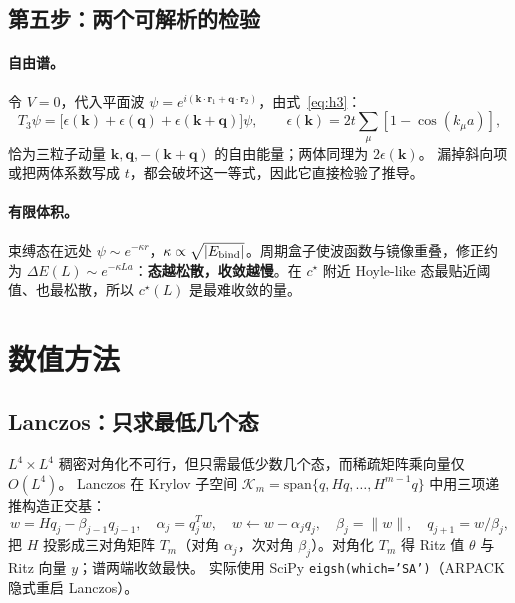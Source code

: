\documentclass[UTF8,fontset=fandol,11pt,a4paper]{ctexart}
\newcommand{\rr}{\mathbf r}
\begin{document}
\subsection{第五步：两个可解析的检验}\label{sec:analytic}
\paragraph{自由谱。}令 $V=0$，代入平面波 $\psi=e^{i(\mathbf k\cdot\rr_1+\mathbf q\cdot\rr_2)}$，由式~\eqref{eq:h3}：
\begin{equation}
T_3\psi=\big[\epsilon(\mathbf k)+\epsilon(\mathbf q)+\epsilon(\mathbf k+\mathbf q)\big]\psi,\qquad
\epsilon(\mathbf k)=2t\sum_{\mu}[1-\cos(k_\mu a)],
\end{equation}
恰为三粒子动量 $\mathbf k,\mathbf q,-(\mathbf k+\mathbf q)$ 的自由能量；两体同理为 $2\epsilon(\mathbf k)$。
漏掉斜向项或把两体系数写成 $t$，都会破坏这一等式，因此它直接检验了推导。

\paragraph{有限体积。}束缚态在远处 $\psi\sim e^{-\kappa r}$，$\kappa\propto\sqrt{|E_{\rm bind}|}$。周期盒子使波函数与镜像重叠，修正约为
$\Delta E(L)\sim e^{-\kappa La}$：\textbf{态越松散，收敛越慢}。在 $c^\star$ 附近 Hoyle-like 态最贴近阈值、也最松散，所以 $c^\star(L)$ 是最难收敛的量。

\section{数值方法}

\subsection{Lanczos：只求最低几个态}
$L^4\times L^4$ 稠密对角化不可行，但只需最低少数几个态，而稀疏矩阵乘向量仅 $O(L^4)$。
Lanczos 在 Krylov 子空间 $\mathcal K_m=\mathrm{span}\{q,Hq,\dots,H^{m-1}q\}$ 中用三项递推构造正交基：
\begin{equation}
w=Hq_j-\beta_{j-1}q_{j-1},\quad \alpha_j=q_j^Tw,\quad w\leftarrow w-\alpha_jq_j,\quad \beta_j=\|w\|,\quad q_{j+1}=w/\beta_j,
\end{equation}
把 $H$ 投影成三对角矩阵 $T_m$（对角 $\alpha_j$，次对角 $\beta_j$）。对角化 $T_m$ 得 Ritz 值 $\theta$ 与 Ritz 向量 $y$；谱两端收敛最快。
实际使用 SciPy \texttt{eigsh(which='SA')}（ARPACK 隐式重启 Lanczos）。
\end{document}
